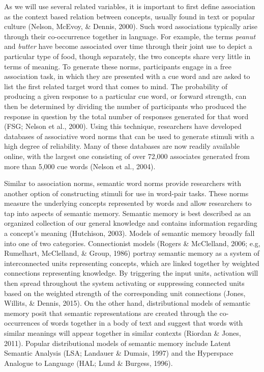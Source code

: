 \documentclass[english,man]{apa6}
\theoremstyle{definition}
\theoremstyle{definition}
\theoremstyle{definition}
\theoremstyle{remark}
\begin{document}
As we will use several related variables, it is important to first
define association as the context based relation between concepts,
usually found in text or popular culture (Nelson, McEvoy, \& Dennis,
2000). Such word associations typically arise through their
co-occurrence together in language. For example, the terms \emph{peanut}
and \emph{butter} have become associated over time through their joint
use to depict a particular type of food, though separately, the two
concepts share very little in terms of meaning. To generate these norms,
participants engage in a free association task, in which they are
presented with a cue word and are asked to list the first related target
word that comes to mind. The probability of producing a given response
to a particular cue word, or forward strength, can then be determined by
dividing the number of participants who produced the response in
question by the total number of responses generated for that word (FSG;
Nelson et al., 2000). Using this technique, researchers have developed
databases of associative word norms that can be used to generate stimuli
with a high degree of reliability. Many of these databases are now
readily available online, with the largest one consisting of over 72,000
associates generated from more than 5,000 cue words (Nelson et al.,
2004).

Similar to association norms, semantic word norms provide researchers
with another option of constructing stimuli for use in word-pair tasks.
These norms measure the underlying concepts represented by words and
allow researchers to tap into aspects of semantic memory. Semantic
memory is best described as an organized collection of our general
knowledge and contains information regarding a concept's meaning
(Hutchison, 2003). Models of semantic memory broadly fall into one of
two categories. Connectionist models (Rogers \& McClelland, 2006; e.g,
Rumelhart, McClelland, \& Group, 1986) portray semantic memory as a
system of interconnected units representing concepts, which are linked
together by weighted connections representing knowledge. By triggering
the input units, activation will then spread throughout the system
activating or suppressing connected units based on the weighted strength
of the corresponding unit connections (Jones, Willits, \& Dennis, 2015).
On the other hand, distributional models of semantic memory posit that
semantic representations are created through the co-occurrences of words
together in a body of text and suggest that words with similar meanings
will appear together in similar contexts (Riordan \& Jones, 2011).
Popular distributional models of semantic memory include Latent Semantic
Analysis (LSA; Landauer \& Dumais, 1997) and the Hyperspace Analogue to
Language (HAL; Lund \& Burgess, 1996).
\end{document}
